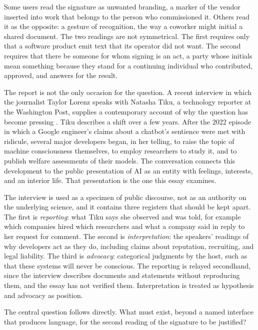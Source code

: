 \documentclass[11pt]{article}
\begin{document}
Some users read the signature as unwanted branding, a marker of the vendor inserted into work that belongs to the person who commissioned it. Others read it as the opposite: a gesture of recognition, the way a coworker might initial a shared document. The two readings are not symmetrical. The first requires only that a software product emit text that its operator did not want. The second requires that there be someone for whom signing is an act, a party whose initials mean something because they stand for a continuing individual who contributed, approved, and answers for the result.

The report is not the only occasion for the question. A recent interview in which the journalist Taylor Lorenz speaks with Natasha Tiku, a technology reporter at the Washington Post, supplies a contemporary account of why the question has become pressing \cite{lorenz2026}. Tiku describes a shift over a few years. After the 2022 episode in which a Google engineer's claims about a chatbot's sentience were met with ridicule, several major developers began, in her telling, to raise the topic of machine consciousness themselves, to employ researchers to study it, and to publish welfare assessments of their models. The conversation connects this development to the public presentation of AI as an entity with feelings, interests, and an interior life. That presentation is the one this essay examines.

The interview is used as a specimen of public discourse, not as an authority on the underlying science, and it contains three registers that should be kept apart. The first is \emph{reporting}: what Tiku says she observed and was told, for example which companies hired which researchers and what a company said in reply to her request for comment. The second is \emph{interpretation}: the speakers' readings of why developers act as they do, including claims about reputation, recruiting, and legal liability. The third is \emph{advocacy}: categorical judgments by the host, such as that these systems will never be conscious. The reporting is relayed secondhand, since the interview describes documents and statements without reproducing them, and the essay has not verified them. Interpretation is treated as hypothesis and advocacy as position.

The central question follows directly. What must exist, beyond a named interface that produces language, for the second reading of the signature to be justified?
\end{document}
